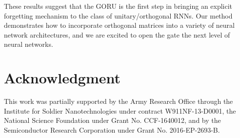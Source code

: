 \documentclass[letterpaper]{article} \usepackage{aaai18}  \usepackage{times}  \usepackage{helvet}  \usepackage{courier}  \usepackage{url}  \usepackage{graphicx}
\begin{document}
These results suggest that the GORU is the first step in bringing an explicit forgetting mechanism to the class of unitary/orthogonal RNNs. Our method demonstrates how to incorporate orthogonal matrices into a variety of neural network architectures, and we are excited to open the gate the next level of neural networks.



\section*{Acknowledgment}
This work was partially supported by the Army Research
Office through the Institute for Soldier Nanotechnologies
under contract W911NF-13-D0001, the National Science
Foundation under Grant No. CCF-1640012, and by the Semiconductor Research Corporation under
Grant No. 2016-EP-2693-B.




\end{document}
